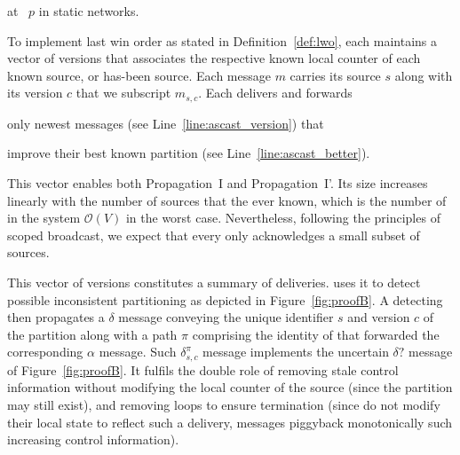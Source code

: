 \begin{algorithm}
  
  \caption{\label{algo:ascast}\NAME at \Process~$p$ in static networks.}
\end{algorithm}

To implement last win order as stated in Definition~\ref{def:lwo},
each \process maintains a vector of versions that associates the
respective known local counter of each known source, or has-been
source. Each message $m$ carries its source $s$ along with its version
$c$ that we subscript $m_{s, c}$.  Each \process delivers and forwards
\begin{inparaenum}[(i)]
\item only newest messages (see Line~\ref{line:ascast_version}) that
\item improve their best known partition (see
  Line~\ref{line:ascast_better}).
\end{inparaenum}
This vector enables both Propagation~I and Propagation~I'.  Its size
increases linearly with the number of sources that the \process ever
known, which is the number of \processes in the system
$\mathcal{O}(V)$ in the worst case.
Nevertheless, following the principles of scoped broadcast, we expect
that every \process only acknowledges a small subset of sources.

This vector of versions constitutes a summary of deliveries. \NAME
uses it to detect possible inconsistent partitioning as depicted in
Figure~\ref{fig:proofB}. A detecting \process then propagates a
$\delta$ message conveying the unique identifier $s$ and version $c$
of the partition along with a path $\pi$ comprising the identity of
\processes that forwarded the corresponding $\alpha$ message. Such
$\delta_{s, c}^{\pi}$ message implements the uncertain $\delta?$
message of Figure~\ref{fig:proofB}. It fulfils the double role of
removing stale control information without modifying the local counter
of the source (since the partition may still exist), and removing
loops to ensure termination (since \processes do not modify their
local state to reflect such a delivery, messages piggyback
monotonically such increasing control information).

